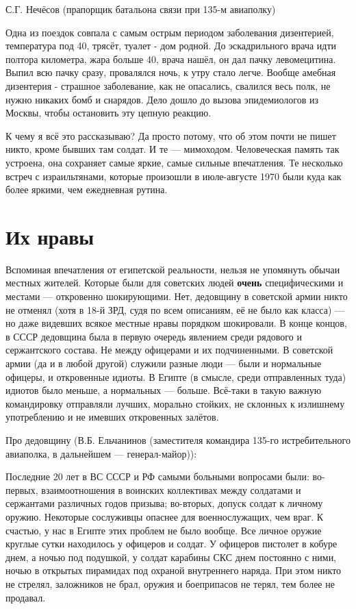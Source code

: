 С.Г. Нечёсов (прапорщик батальона связи при 135-м авиаполку)

\begin{textcitation}
	Одна из поездок совпала с самым острым периодом заболевания дизентерией, температура под 40, трясёт, туалет - дом родной. До эскадрильного врача идти полтора километра, жара больше 40, врача нашёл, он дал пачку левомецитина. Выпил всю пачку сразу, провалялся ночь, к утру стало легче. Вообще амебная дизентерия - страшное заболевание, как не опасались, свалился весь полк, не нужно никаких бомб и снарядов. Дело дошло до вызова эпидемиологов из Москвы, чтобы остановить эту цепную реакцию. 
\end{textcitation}

К чему я всё это рассказываю? Да просто потому, что об этом почти не пишет никто, кроме бывших там солдат. И те — мимоходом. Человеческая память так устроена, она сохраняет самые яркие, самые сильные впечатления. Те несколько встреч с израильтянами, которые произошли в июле-августе 1970 были куда как более яркими, чем ежедневная рутина. 

\section{Их нравы}

Вспоминая впечатления от египетской реальности, нельзя не упомянуть обычаи местных жителей. Которые были для советских людей \textbf{очень} специфическими и местами — откровенно шокирующими. Нет, дедовщину в советской армии никто не отменял (хотя в 18-й ЗРД, судя по всем описаниям, её не было как класса) — но даже видевших всякое местные нравы порядком шокировали. В конце концов, в СССР дедовщина была в первую очередь явлением среди рядового и сержантского состава. Не между офицерами и их подчиненными. В советской армии (да и в любой другой) служили разные люди — были и нормальные офицеры, и откровенные идиоты. В Египте (в смысле, среди отправленных туда) идиотов было меньше, а нормальных — больше. Всё-таки в такую важную командировку отправляли лучших, морально стойких, не склонных к излишнему употреблению и не имевших откровенных залётов. 

Про дедовщину (В.Б. Ельчанинов (заместителя командира 135-го истребительного авиаполка, в дальнейшем — генерал-майор)):

\begin{textcitation}
	Последние 20 лет в ВС СССР и РФ самыми больными вопросами были: во-первых, взаимоотношения в воинских коллективах между солдатами и сержантами различных годов призыва; во-вторых, допуск солдат к личному оружию. Некоторые сослуживцы опаснее для военнослужащих, чем враг. К счастью, у нас в Египте этих проблем не было вообще. Все личное оружие круглые сутки находилось у офицеров и солдат. У офицеров пистолет в кобуре днем, а ночью под подушкой, у солдат карабины СКС днем постоянно с ними, ночью в открытых пирамидах под охраной внутреннего наряда. При этом никто не стрелял, заложников не брал, оружия и боеприпасов не терял, тем более не продавал.
\end{textcitation}

